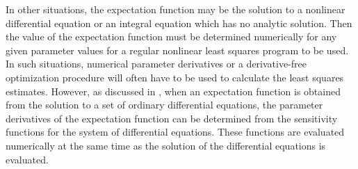 In other situations, the expectation function may be the solution to a
nonlinear differential equation or an
integral equation which has no analytic solution.
Then the value of the expectation function must be determined
numerically for any given parameter values for a regular
nonlinear least squares program to be used.
In such situations, numerical parameter derivatives or a
derivative-free optimization procedure will often have to be used
to calculate the least squares estimates.
However, as discussed in , when an expectation function
is obtained from the solution to a set of ordinary differential
equations, the parameter derivatives of the expectation function
can be determined from the sensitivity functions for the
system of differential equations.
These functions are evaluated numerically at the same time
as the solution of the differential equations is evaluated.

